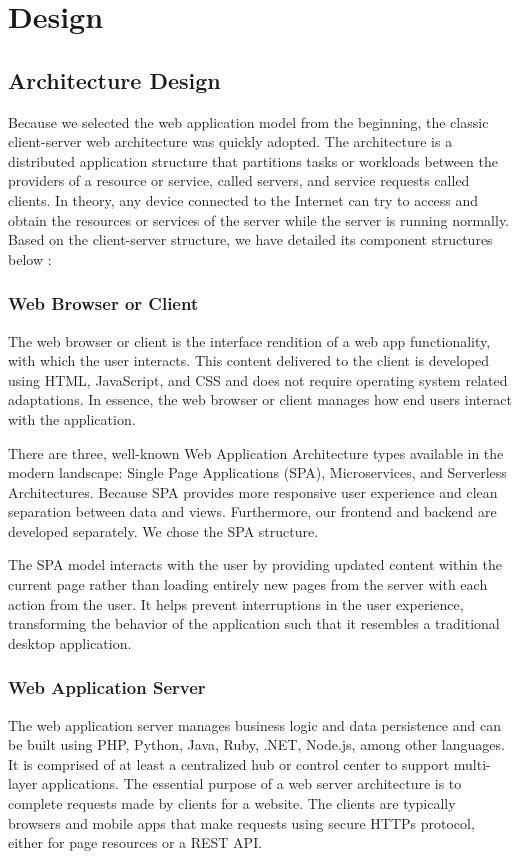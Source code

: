 \section{Design}
\label{sec:Design}

\subsection{Architecture Design}
\label{sec:Design>Architecture Design}
Because we selected the web application model from the beginning, the classic client-server web architecture was quickly adopted. The architecture is a distributed application structure that partitions tasks or workloads between the providers of a resource or service, called servers, and service requests called clients. In theory, any device connected to the Internet can try to access and obtain the resources or services of the server while the server is running normally. Based on the client-server structure, we have detailed its component structures below \cite{web:Architecture-design}:

\subsubsection{Web Browser or Client}
\label{sec:Design>Architecture Design>Web Browser or Client}
The web browser or client is the interface rendition of a web app functionality, with which the user interacts. This content delivered to the client is developed using HTML, JavaScript, and CSS and does not require operating system related adaptations. In essence, the web browser or client manages how end users interact with the application.

There are three, well-known Web Application Architecture types available in the modern landscape: Single Page Applications (SPA), Microservices, and Serverless Architectures. Because SPA provides more responsive user experience and clean separation between data and views. Furthermore, our frontend and backend are developed separately. We chose the SPA structure.

The SPA model interacts with the user by providing updated content within the current page rather than loading entirely new pages from the server with each action from the user. It helps prevent interruptions in the user experience, transforming the behavior of the application such that it resembles a traditional desktop application.

\subsubsection{Web Application Server}
\label{sec:Design>Architecture Design>Web Application Server}
The web application server manages business logic and data persistence and can be built using PHP, Python, Java, Ruby, .NET, Node.js, among other languages. It is comprised of at least a centralized hub or control center to support multi-layer applications. The essential purpose of a web server architecture is to complete requests made by clients for a website. The clients are typically browsers and mobile apps that make requests using secure HTTPs protocol, either for page resources or a REST API.

